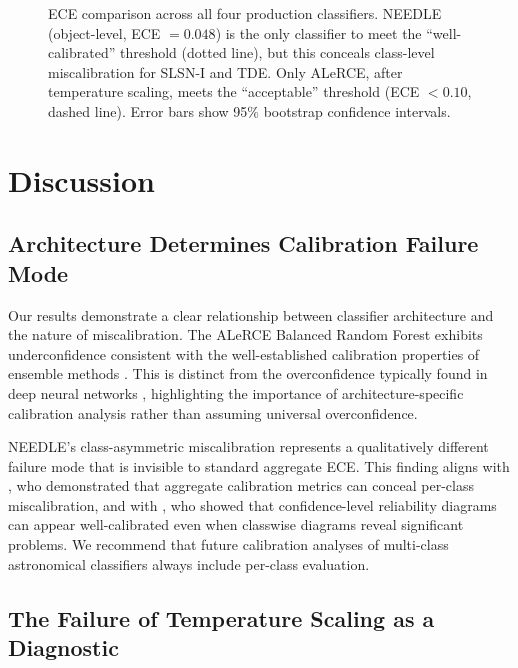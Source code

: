 \documentclass[twocolumn]{aastex631}
\begin{document}
\begin{figure}
\caption{ECE comparison across all four production classifiers. NEEDLE (object-level, ECE $= 0.048$) is the only classifier to meet the ``well-calibrated'' threshold (dotted line), but this conceals class-level miscalibration for SLSN-I and TDE. Only ALeRCE, after temperature scaling, meets the ``acceptable'' threshold (ECE $< 0.10$, dashed line). Error bars show 95\% bootstrap confidence intervals. \label{fig:summary}}
\end{figure}


\section{Discussion} \label{sec:discussion}

\subsection{Architecture Determines Calibration Failure Mode}

Our results demonstrate a clear relationship between classifier architecture and the nature of miscalibration. The ALeRCE Balanced Random Forest exhibits underconfidence consistent with the well-established calibration properties of ensemble methods \citep{niculescumizil2005, bostrom2008, loecher2024}. This is distinct from the overconfidence typically found in deep neural networks \citep{guo2017}, highlighting the importance of architecture-specific calibration analysis rather than assuming universal overconfidence.

NEEDLE's class-asymmetric miscalibration represents a qualitatively different failure mode that is invisible to standard aggregate ECE. This finding aligns with \citet{nixon2019}, who demonstrated that aggregate calibration metrics can conceal per-class miscalibration, and with \citet{kull2019}, who showed that confidence-level reliability diagrams can appear well-calibrated even when classwise diagrams reveal significant problems. We recommend that future calibration analyses of multi-class astronomical classifiers always include per-class evaluation.

\subsection{The Failure of Temperature Scaling as a Diagnostic}
\end{document}
